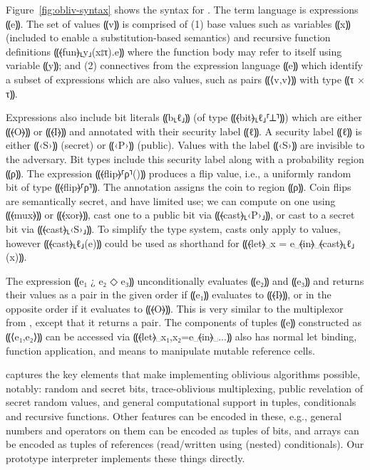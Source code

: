 Figure~\ref{fig:obliv-syntax} shows the syntax for \obliv. The term language is
expressions ⸨e⸩. The set of values ⸨v⸩ is comprised of (1) base values such as
variables ⸨x⸩ (included to enable a substitution-based semantics) and recursive function
definitions ⸨⦑fun⦒⸤y⸥(x{⦂}τ).e⸩ where the function body may refer to itself
using variable ⸨y⸩; and (2) connectives from the expression language ⸨e⸩ which
identify a subset of expressions which are also values, such as pairs ⸨⟨v,v⟩⸩
with type ⸨τ × τ⸩.

Expressions also include bit literals ⸨b⸤ℓ⸥⸩ (of type ⸨⦑bit⦒⸤ℓ⸥⸢⊥⸣⸩) which are
either ⸨⦑O⦒⸩ or ⸨⦑I⦒⸩ and annotated with their security label
⸨ℓ⸩.
%
A security label ⸨ℓ⸩ is either
⸨‹S›⸩ (secret) or ⸨‹P›⸩ (public). Values with the label ⸨‹S›⸩ are invisible to
the adversary. Bit types include this security label along with a probability
region ⸨ρ⸩. The expression ⸨⦑flip⦒⸢ρ⸣()⸩ produces a flip value, i.e.,
a uniformly random bit of type ⸨⦑flip⦒⸢ρ⸣⸩.
The annotation assigns the coin to region ⸨ρ⸩. Coin flips are semantically secret, and have
limited use; we can compute on one using ⸨⦑mux⦒⸩ or ⸨⦑xor⦒⸩, cast one to a
public bit via ⸨⦑cast⦒⸤‹P›⸥⸩, or cast to a secret bit via ⸨⦑cast⦒⸤‹S›⸥⸩. To
simplify the type system, casts only apply to values, however ⸨⦑cast⦒⸤ℓ⸥(e)⸩
could be used as shorthand for ⸨⦑let⦒␣x = e␣⦑in⦒␣⦑cast⦒⸤ℓ⸥(x)⸩.

The expression ⸨e₁ {¿} e₂ {◇} e₃⸩ unconditionally evaluates ⸨e₂⸩ and ⸨e₃⸩ and
returns their values as a pair in the given order if ⸨e₁⸩ evaluates to ⸨⦑I⦒⸩, or in the
opposite order if it evaluates to ⸨⦑O⦒⸩. This is very similar to the multiplexor
from \mpc, except that it returns a pair. The components of tuples
⸨e⸩ constructed as ⸨⟨e₁,e₂⟩⸩ can be accessed via ⸨⦑let⦒␣x₁,x₂=e␣⦑in⦒␣...⸩
\obliv also has normal let binding, function application, and means to manipulate
mutable reference cells.

\obliv captures the key elements that make implementing oblivious
algorithms possible, notably: random and secret bits, trace-oblivious
multiplexing, public revelation of secret random values, and general
computational support in tuples, conditionals and recursive functions.
Other features can be encoded in these, e.g., general numbers and
operators on them can be encoded as tuples of bits, and arrays can be
encoded as tuples of references (read/written using (nested) conditionals).
Our prototype interpreter implements these things directly.


